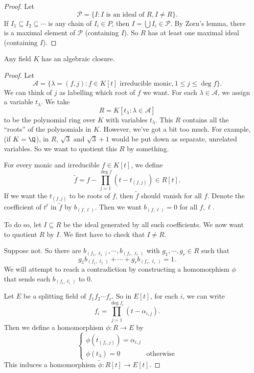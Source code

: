 \documentclass[a4paper]{article}
\begin{document}
\begin{proof}
  Let
  \[
    \mathcal{P} = \{I: I\text{ is an ideal of }R, I \not= R\}.
  \]
  If $I_1 \subseteq I_2 \subseteq \cdots$ is any chain of $I_i \in P$, then $I = \bigcup I_i \in \mathcal{P}$. By Zorn's lemma, there is a maximal element of $\mathcal{P}$ (containing $I$). So $R$ has at least one maximal ideal (containing $I$).
\end{proof}

\begin{thm}
  Any field $K$ has an algebraic closure.
\end{thm}

\begin{proof}
  Let
  \[
    \mathcal{A} = \{\lambda = (f, j): f\in K[t] \text{ irreducible monic}, 1 \leq j \leq \deg f\}.
  \]
  We can think of $j$ as labelling which root of $f$ we want. For each $\lambda \in \mathcal{A}$, we assign a variable $t_\lambda$. We take
  \[
    R = K[t_\lambda: \lambda \in \mathcal{A}]
  \]
  to be the polynomial ring over $K$ with variables $t_\lambda$. This $R$ contains all the ``roots'' of the polynomials in $K$. However, we've got a bit too much. For example, (if $K = \Q$), in $R$, $\sqrt{3}$ and $\sqrt{3} + 1$ would be put down as separate, unrelated variables. So we want to quotient this $R$ by something.

  For every monic and irreducible $f \in K[t]$, we define
  \[
    \tilde{f} = f - \prod_{j = 1}^{\deg f} (t - t_{(f, j)}) \in R[t].
  \]
  If we want the $t_{(f, j)}$ to be roots of $f$, then $\tilde{f}$ should vanish for all $f$. Denote the coefficient of $t^\ell$ in $\tilde{f}$ by $b_{(f, \ell)}$. Then we want $b_{(f, \ell)} = 0$ for all $f, \ell$.

  To do so, let $I\subseteq R$ be the ideal generated by all such coefficients. We now want to quotient $R$ by $I$. We first have to check that $I\not= R$.

  Suppose not. So there are $b_{(f_1, \ell_1)}, \cdots, b_{(f_r, \ell_r)}$ with $g_1, \cdots, g_r \in R$ such that
  \[
    g_1 b_{(f_1, \ell_1)} + \cdots + g_r b_{(f_r, \ell_r)} = 1.\tag{$*$}
  \]
  We will attempt to reach a contradiction by constructing a homomorphism $\phi$ that sends each $b_{(f_i, \ell_i)}$ to $0$.

  Let $E$ be a splitting field of $f_1f_2\cdots f_r$. So in $E[t]$, for each $i$, we can write
  \[
    f_i = \prod_{j = 1}^{\deg f_i} (t - \alpha_{i, j}).
  \]
  Then we define a homomorphism $\phi: R \to E$ by
  \[
    \begin{cases}
      \phi(t_{(f_i, j)}) = \alpha_{i, j}\\
      \phi(t_\lambda) = 0 & \text{otherwise}
    \end{cases}
  \]
  This induces a homomorphism $\tilde{\phi}: R[t] \to E[t]$.


\end{proof}
\end{document}
